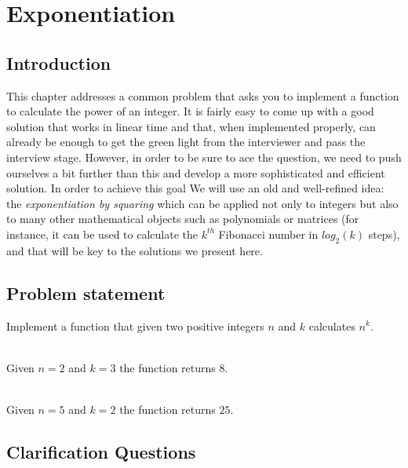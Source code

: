 %

\chapter{Exponentiation}
\label{ch:exponentiation}
\section*{Introduction}
This chapter addresses a common problem that asks you to implement a function to calculate the power of an integer.  
It is fairly easy to come up with a good solution that works in linear time and that, 
when implemented properly, can already be enough to get the green light from the interviewer and pass the interview stage.
However, in order to be sure to ace the question, we need to push ourselves a bit further than this and develop a more sophisticated and efficient solution.
In order to achieve this goal We will use an old and well-refined idea: the \textit{exponentiation by squaring} which can be
applied not only to integers but also to many other mathematical objects such as polynomials or
matrices (for instance, it can be used to calculate the $k^{th}$ Fibonacci number in $log_2(k)$ steps), and that will be key to the solutions we present here. 

\section{Problem statement}

\begin{exercise}
Implement a function that given two positive integers $n$ and $k$ calculates $n^k$.

    \begin{example}
        \hfill \\
        Given $n=2$ and $k=3$ the function returns $8$.
    \end{example}

    \begin{example}
        \hfill \\
        Given $n=5$ and $k=2$ the function returns $25$.
    \end{example}

\end{exercise}

\section{Clarification Questions}

